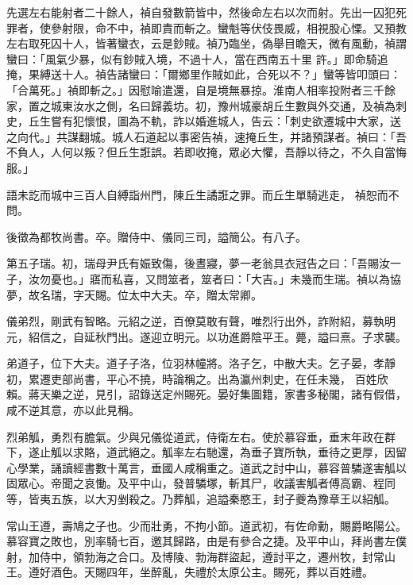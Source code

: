 \begin{pinyinscope}
 先選左右能射者二十餘人，禎自發數箭皆中，然後命左右以次而射。先出一囚犯死罪者，使參射限，命不中，禎即責而斬之。蠻魁等伏伎畏威，相視股心慄。又預教左右取死囚十人，皆著蠻衣，云是鈔賊。禎乃臨坐，偽舉目瞻天，微有風動，禎謂蠻曰：「風氣少暴，似有鈔賊入境，不過十人，當在西南五十里
 許。」即命騎追掩，果縛送十人。禎告諸蠻曰：「爾鄉里作賊如此，合死以不？」蠻等皆叩頭曰：「合萬死。」禎即斬之。」因慰喻遣還，自是境無暴掠。淮南人相率投附者三千餘家，置之城東汝水之側，名曰歸義坊。初，豫州城豪胡丘生數與外交通，及禎為刺史，丘生嘗有犯懷恨，圖為不軌，詐以婚進城人，告云：「刺史欲遷城中大家，送之向代。」共謀翻城。城人石道起以事密告禎，速掩丘生，并諸預謀者。禎曰：「吾不負人，人何以叛？但丘生誑誤。若即收掩，眾必大懼，吾靜以待之，不久自當悔服。」



 語未訖而城中三百人自縛詣州門，陳丘生譎誑之罪。而丘生單騎逃走，
 禎恕而不問。



 後徵為都牧尚書。卒。贈侍中、儀同三司，謚簡公。有八子。



 第五子瑞。初，瑞母尹氏有娠致傷，後晝寢，夢一老翁具衣冠告之曰：「吾賜汝一子，汝勿憂也。」寤而私喜，又問筮者，筮者曰：「大吉。」未幾而生瑞。禎以為協夢，故名瑞，字天賜。位太中大夫。卒，贈太常卿。



 儀弟烈，剛武有智略。元紹之逆，百僚莫敢有聲，唯烈行出外，詐附紹，募執明元，紹信之，自延秋門出。遂迎立明元。以功進爵陰平王。薨，謚曰熹。子求襲。



 弟道子，位下大夫。道子子洛，位羽林幢將。洛子乞，中散大夫。乞子晏，孝靜初，累遷吏部尚書，平心不撓，時論稱之。出為瀛州刺史，在任未幾，
 百姓欣賴。蔣天樂之逆，見引，詔錄送定州賜死。晏好集圖籍，家書多秘閣，諸有假借，咸不逆其意，亦以此見稱。



 烈弟觚，勇烈有膽氣。少與兄儀從道武，侍衛左右。使於慕容垂，垂末年政在群下，遂止觚以求賂，道武絕之。觚率左右馳還，為垂子寶所執，垂待之更厚，因留心學業，誦讀經書數十萬言，垂國人咸稱重之。道武之討中山，慕容普驎遂害觚以固眾心。帝聞之哀慟。及平中山，發普驎塚，斬其尸，收議害觚者傅高霸、程同等，皆夷五族，以大刃剉殺之。乃葬觚，追謚秦愍王，封子夔為豫章王以紹觚。



 常山王遵，壽鳩之子也。少而壯勇，不拘小節。道武初，有佐命勳，賜爵略陽公。慕容寶之敗也，別率騎七百，邀其歸路，由是有參合之捷。及平中山，拜尚書左僕射，加侍中，領勃海之合口。及博陵、勃海群盜起，遵討平之，遷州牧，封常山王。遵好酒色。天賜四年，坐醉亂，失禮於太原公主。賜死，葬以百姓禮。




\end{pinyinscope}
